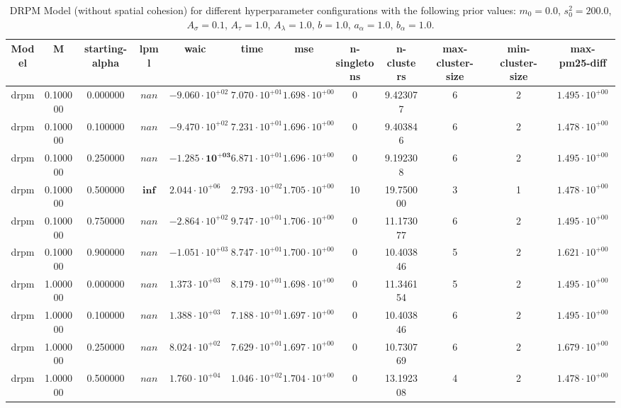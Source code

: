 \begin{table}
\caption{DRPM Model (without spatial cohesion) for different hyperparameter configurations with the following prior values: $m_0 = 0.0$, $s_0^2 = 200.0$, $A_\sigma = 0.1$, $A_\tau = 1.0$, $A_\lambda = 1.0$, $b = 1.0$, $a_\alpha = 1.0$, $b_\alpha = 1.0$.}
\centering\begin{tabular}{cccccccccccc}
\toprule
Model & M & starting-alpha & lpml & waic & time & mse & n-singletons & n-clusters & max-cluster-size & min-cluster-size & max-pm25-diff \\
\midrule
drpm & 0.100000 & 0.000000 & $nan$ & $-9.060 \cdot 10^{+02}$ & $7.070 \cdot 10^{+01}$ & $1.698 \cdot 10^{+00}$ & 0 & 9.423077 & 6 & 2 & $1.495 \cdot 10^{+00}$ \\
drpm & 0.100000 & 0.100000 & $nan$ & $-9.470 \cdot 10^{+02}$ & $7.231 \cdot 10^{+01}$ & $1.696 \cdot 10^{+00}$ & 0 & 9.403846 & 6 & 2 & $1.478 \cdot 10^{+00}$ \\
drpm & 0.100000 & 0.250000 & $nan$ & $\mathbf{-1.285 \cdot 10^{+03}}$ & $6.871 \cdot 10^{+01}$ & $1.696 \cdot 10^{+00}$ & 0 & 9.192308 & 6 & 2 & $1.495 \cdot 10^{+00}$ \\
drpm & 0.100000 & 0.500000 & $\mathbf{inf}$ & $2.044 \cdot 10^{+06}$ & $2.793 \cdot 10^{+02}$ & $1.705 \cdot 10^{+00}$ & 10 & 19.750000 & 3 & 1 & $1.478 \cdot 10^{+00}$ \\
drpm & 0.100000 & 0.750000 & $nan$ & $-2.864 \cdot 10^{+02}$ & $9.747 \cdot 10^{+01}$ & $1.706 \cdot 10^{+00}$ & 0 & 11.173077 & 6 & 2 & $1.495 \cdot 10^{+00}$ \\
drpm & 0.100000 & 0.900000 & $nan$ & $-1.051 \cdot 10^{+03}$ & $8.747 \cdot 10^{+01}$ & $1.700 \cdot 10^{+00}$ & 0 & 10.403846 & 5 & 2 & $1.621 \cdot 10^{+00}$ \\
drpm & 1.000000 & 0.000000 & $nan$ & $1.373 \cdot 10^{+03}$ & $8.179 \cdot 10^{+01}$ & $1.698 \cdot 10^{+00}$ & 0 & 11.346154 & 5 & 2 & $1.495 \cdot 10^{+00}$ \\
drpm & 1.000000 & 0.100000 & $nan$ & $1.388 \cdot 10^{+03}$ & $7.188 \cdot 10^{+01}$ & $1.697 \cdot 10^{+00}$ & 0 & 10.403846 & 6 & 2 & $1.495 \cdot 10^{+00}$ \\
drpm & 1.000000 & 0.250000 & $nan$ & $8.024 \cdot 10^{+02}$ & $7.629 \cdot 10^{+01}$ & $1.697 \cdot 10^{+00}$ & 0 & 10.730769 & 6 & 2 & $1.679 \cdot 10^{+00}$ \\
drpm & 1.000000 & 0.500000 & $nan$ & $1.760 \cdot 10^{+04}$ & $1.046 \cdot 10^{+02}$ & $1.704 \cdot 10^{+00}$ & 0 & 13.192308 & 4 & 2 & $1.478 \cdot 10^{+00}$ \\

\end{tabular}
\end{table}
